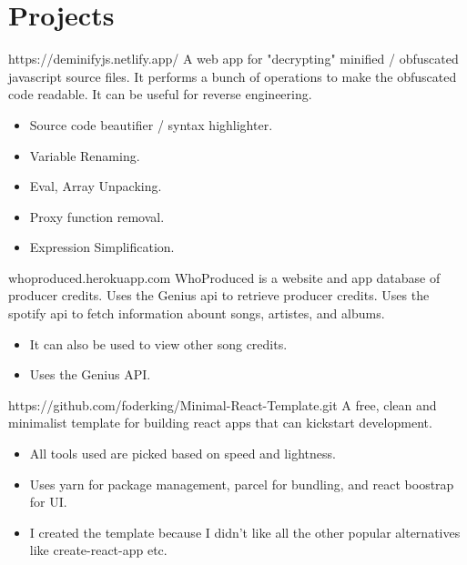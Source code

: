 \section{Projects}
\begin{experience}{https://deminifyjs.netlify.app/}{
}
A web app for "decrypting" minified / obfuscated javascript source files.
It performs a bunch of operations to make the obfuscated code readable.
It can be useful for reverse engineering.
\begin{itemize}
	\item Source code beautifier / syntax highlighter.
	\item Variable Renaming.
	\item Eval, Array Unpacking.
	\item Proxy function removal.
	\item Expression Simplification.
\end{itemize}
\end{experience}

\begin{experience}{whoproduced.herokuapp.com}{
}
WhoProduced is a website and app database of producer credits.
Uses the Genius api to retrieve producer credits.
Uses the spotify api to fetch information abount songs, artistes, and albums.

\begin{itemize}
	\item It can also be used to view other song credits.
	\item Uses the Genius API.
\end{itemize}

\end{experience}

\begin{experience}{https://github.com/foderking/Minimal-React-Template.git}{
}
A free, clean and minimalist template for building react apps that can kickstart development.

\begin{itemize}
	\item All tools used are picked based on speed and lightness.
	\item Uses yarn for package management, parcel for bundling, and react boostrap for UI.
	\item I created the template because I didn't like all the other popular alternatives like create-react-app etc.
\end{itemize}

\end{experience}


